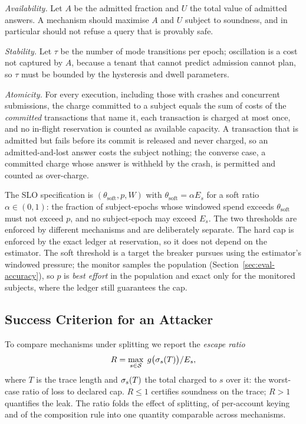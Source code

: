 \emph{Availability.} Let $A$ be the admitted fraction and $U$ the total value of
admitted answers. A mechanism should maximise $A$ and $U$ subject to soundness,
and in particular should not refuse a query that is provably safe.

\emph{Stability.} Let $\tau$ be the number of mode transitions per epoch;
oscillation is a cost not captured by $A$, because a tenant that cannot predict
admission cannot plan, so $\tau$ must be bounded by the hysteresis and dwell
parameters.

\emph{Atomicity.} For every execution, including those with crashes and
concurrent submissions, the charge committed to a subject equals the sum of costs
of the \emph{committed} transactions that name it, each transaction is charged at
most once, and no in-flight reservation is counted as available capacity. A
transaction that is admitted but fails before its commit is released and never
charged, so an admitted-and-lost answer costs the subject nothing; the converse
case, a committed charge whose answer is withheld by the crash, is permitted and
counted as over-charge.

The SLO specification is $(\theta_{\mathrm{soft}},p,W)$ with
$\theta_{\mathrm{soft}}=\alpha E_s$ for a soft ratio $\alpha\in(0,1)$: the
fraction of subject-epochs whose windowed spend exceeds $\theta_{\mathrm{soft}}$
must not exceed $p$, and no subject-epoch may exceed $E_s$. The two thresholds
are enforced by different mechanisms and are deliberately separate. The hard cap
is enforced by the exact ledger at reservation, so it does not depend on the
estimator. The soft threshold is a target the breaker pursues using the
estimator's windowed pressure; the monitor samples the population (Section~\ref{sec:eval-accuracy}), so $p$ is \emph{best effort} in the population and
exact only for the monitored subjects, where the ledger still guarantees the cap.

\subsection{Success Criterion for an Attacker}

To compare mechanisms under splitting we report the \emph{escape ratio}
\begin{equation}
R=\max_{s\in\mathcal{S}}\;g\bigl(\sigma_s(T)\bigr)/E_s ,
\label{eq:escape}
\end{equation}
where $T$ is the trace length and $\sigma_s(T)$ the total charged to $s$ over
it: the worst-case ratio of loss to declared cap. $R\le1$ certifies soundness on the trace; $R>1$ quantifies the
leak. The ratio folds the effect of splitting, of per-account keying and of the
composition rule into one quantity comparable across mechanisms.
